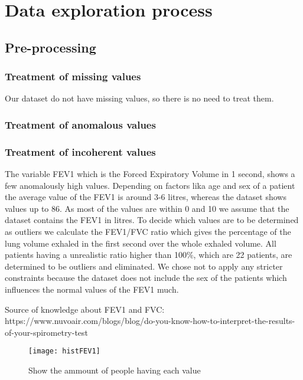 

\section{Data exploration process}

\subsection{Pre-processing}
\subsubsection{Treatment of missing values}
Our dataset do not have missing values, so there is no need to treat them.
\subsubsection{Treatment of anomalous values}
\subsubsection{Treatment of incoherent values}
The variable FEV1 which is the Forced Expiratory Volume in 1 second, shows a few anomalously high values. Depending on factors lika age and sex of a patient the average value of the FEV1 is around 3-6 litres, whereas the dataset shows values up to 86. As most of the values are within 0 and 10 we assume that the dataset contains the FEV1 in litres. To decide which values are to be determined as outliers we calculate the FEV1/FVC ratio which gives the percentage of the lung volume exhaled in the first second over the whole exhaled volume. All patients having a unrealistic ratio higher than 100\%, which are 22 patients, are determined to be outliers and eliminated. We chose not to apply any stricter constraints because the dataset does not include the sex of the patients which influences the normal values of the FEV1 much.

Source of knowledge about FEV1 and FVC:
https://www.nuvoair.com/blogs/blog/do-you-know-how-to-interpret-the-results-of-your-spirometry-test

\begin{figure}[bh]
\centering
\texttt{[image: histFEV1]}
\label{fig:histFEV1}
\caption{Show the ammount of people having each value}
\end{figure}
